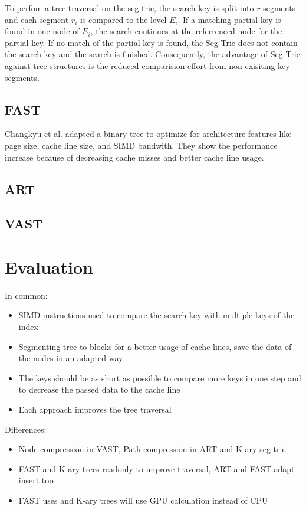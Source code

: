 \documentclass[conference]{IEEEtran}
\begin{document}
To perfom a tree traversal on the seg-trie, the search key is split into $r$ segments and each segment $r_i$ is compared to the level $E_i$. If a matching partial key is found in one node of $E_i$, the search continues at the referrenced node for the partial key. If no match of the partial key is found, the Seg-Trie does not contain the search key and the search is finished. Consequently, the advantage of Seg-Trie against tree structures is the reduced comparision effort from non-exisiting key segments. 


\subsection{FAST}\label{SCM}
Changkyu et al. adapted a binary tree to optimize for architecture features like page size, cache line size, and SIMD bandwith. They show the performance increase because of decreasing cache misses and better cache line usage.  
\subsection{ART}\label{SCM}

\subsection{VAST}\label{SCM}

\section{Evaluation}
In common:
\begin{itemize}
	\item SIMD instructions used to compare the search key with multiple keys of the index
	\item Segmenting tree to blocks for a better usage of cache lines, save the data of the nodes in an adapted way
	\item The keys should be as short as possible to compare more keys in one step and to decrease the passed data to the cache line
	\item Each approach improves the tree traversal
\end{itemize}

Differences:
\begin{itemize}
	\item Node compression in VAST, Path compression in ART and K-ary seg trie
	\item FAST and K-ary trees readonly to improve traversal, ART and FAST adapt insert too
	\item FAST uses and K-ary trees will use GPU calculation instead of CPU
\end{itemize}
\end{document}
